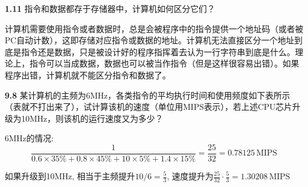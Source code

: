 \documentclass[UTF8]{report}
\newcommand{\unit}[1]{\,\mathrm{#1}}%
\newcommand{\problem}[1]{{\setlength{\parskip}{10pt}\noindent \bf{#1}}}
\newenvironment{solution}{{\noindent\hskip 2em \bf 解 \quad}}{}
\begin{document}
\problem{1.11} 指令和数据都存于存储器中，计算机如何区分它们？

\begin{solution}
    计算机需要使用指令或者数据时，总是会被程序中的指令提供一个地址码（或者被PC自动计数），这即存储对应指令或数据的地址。计算机无法直接区分一个地址到底是指令还是数据，只是被设计好的程序指挥着去认为一行字符串到底是什么。理论上，指令可以当成数据，数据也可以被当作指令（但是这样很容易出错）。如果程序出错，计算机就不能区分指令和数据了。
\end{solution}

\problem{9.8} 某计算机的主频为6MHz，各类指令的平均执行时间和使用频度如下表所示（表就不打出来了），试计算该机的速度（单位用MIPS表示），若上述CPU芯片升级为10MHz，则该机的运行速度又为多少？

\begin{solution}
    6MHz的情况:
    \[
        \frac{1}{0.6\times 35\% + 0.8\times 45\% + 10\times 5\% + 1.4\times 15\%} = \frac{25}{32} = 0.78125 \unit{MIPS}
    \]

    如果升级到10MHz, 相当于主频提升$10/6 = \frac{5}{3}$, 速度提升为$\frac{25}{32}\cdot\frac{5}{3} = 1.30208\unit{MIPS}$
\end{solution}
\end{document}
